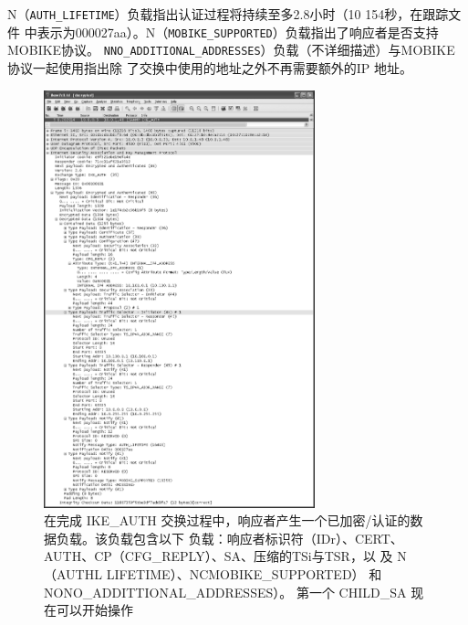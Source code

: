 N（\verb|AUTH_LIFETIME|）负载指出认证过程将持续至多2.8小时（10 154秒，在跟踪文件
中表示为000027aa）。N（\verb|MOBIKE_SUPPORTED|）负载指出了响应者是否支持 MOBIKE协议。
\verb|NNO_ADDITIONAL_ADDRESSES|）负载（不详细描述）与MOBIKE 协议一起使用指出除
了交换中使用的地址之外不再需要额外的IP 地址。
\begin{figure}[!htb]
    \centering
	\includegraphics[width=0.7\textwidth]{imgs/18/18-25.png}
	\caption{在完成 IKE\_AUTH 交换过程中，响应者产生一个已加密/认证的数据负载。该负载包含以下
            负载：响应者标识符（IDr）、CERT、AUTH、CP（CFG\_REPLY）、SA、压缩的TSi与TSR，以
            及 N（AUTHL LIFETIME）、NCMOBIKE\_SUPPORTED） 和 NONO\_ADDITTIONAL\_ADDRESSES）。
            第一个 CHILD\_SA 现在可以开始操作}
\end{figure}

